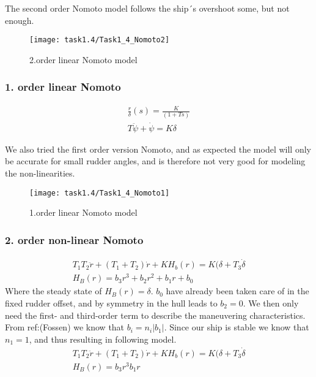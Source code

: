 The second order Nomoto model follows the ship´s overshoot some, but not enough.

\begin{figure}[h]
    \centering
    \texttt{[image: task1.4/Task1\_4\_Nomoto2]}
    \caption{2.order linear Nomoto model}
    \label{fig:nomoto2_lin}
\end{figure}

\subsubsection*{1. order linear Nomoto}

\begin{equation}
\begin{split}
	\frac{r}{\delta}(s) = \frac{K}{(1+Ts) } \\
	T\ddot{\psi} + \dot{\psi} = K\delta
\end{split}
\end{equation}

We also tried the first order version Nomoto, and as expected the model will only be accurate for small rudder angles, and is therefore not very good for modeling the non-linearities.

\begin{figure}[h]
    \centering
    \texttt{[image: task1.4/Task1\_4\_Nomoto1]}
    \caption{1.order linear Nomoto model}
    \label{fig:nomoto1_lin}
\end{figure}

\subsubsection*{2. order non-linear Nomoto}

\begin{equation}
\begin{split}
	T_1 T_2 \ddot{r} + (T_1 + T_2)\dot{r} + KH_b(r) = K(\delta + T_3\dot{\delta} \\
	H_B(r) = b_3r^3 + b_2r^2 + b_1r + b_0
\end{split}
\end{equation}
Where the steady state of $H_B(r)=\delta$. $b_0$ have already been taken care of in the fixed rudder offset, and by symmetry in the hull leads to $b_2 = 0$. We then only need the first- and third-order term to describe the maneuvering characteristics. From ref:(Fossen) we know that $b_i = n_i |b_1|$. Since our ship is stable we know that $n_1=1$, and thus resulting in following model.
\begin{equation}
\begin{split}
	T_1 T_2 \ddot{r} + (T_1 + T_2)\dot{r} + KH_b(r) = K(\delta + T_3\dot{\delta} \\
	H_B(r) = b_3r^3  b_1r
\end{split}
\end{equation}

